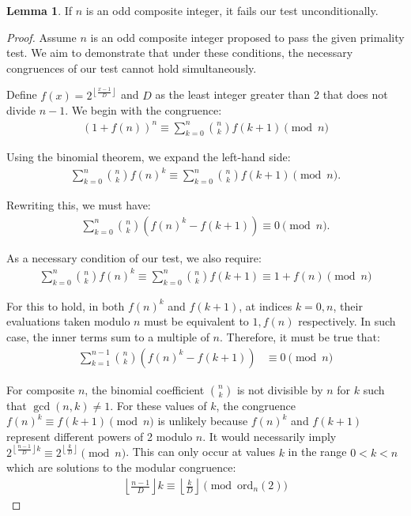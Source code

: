 \documentclass{article}
\theoremstyle{plain}
\theoremstyle{definition}
\newtheorem{lemma}{Lemma}
\begin{document}
\begin{lemma} \label{lemma:composites}
    If $n$ is an odd composite integer, it fails our test unconditionally.
\end{lemma}
\begin{proof}
    Assume \( n \) is an odd composite integer proposed to pass the given primality test. We aim to demonstrate that under these conditions, the necessary congruences of our test cannot hold simultaneously.
    
    Define \( f(x) = 2^{\left\lfloor \frac{x-1}{D} \right\rfloor} \) and \( D \) as the least integer greater than 2 that does not divide \( n-1 \). We begin with the congruence:
    \begin{align}
        (1 + f(n))^n \equiv \sum_{k=0}^{n} \binom{n}{k} f(k+1) \pmod{n}
    \end{align}

    Using the binomial theorem, we expand the left-hand side:
    \begin{align}
        \sum_{k=0}^{n} \binom{n}{k} f(n)^k \equiv \sum_{k=0}^{n} \binom{n}{k} f(k+1) \pmod{n}.
    \end{align}

    Rewriting this, we must have:
    \begin{align}
        \sum_{k=0}^{n} \binom{n}{k} \left(f(n)^k - f(k+1)\right) \equiv 0 \pmod{n}.
    \end{align}
    
    As a necessary condition of our test, we also require:
    \begin{align}
          \sum_{k=0}^{n} \binom{n}{k} f(n)^k \equiv \sum_{k=0}^{n} \binom{n}{k} f(k+1) \equiv 1 + f(n) \pmod{n}
    \end{align}

    For this to hold, in both $f(n)^k$ and $f(k+1)$, at indices $k=0,n$, their evaluations taken modulo $n$ must be equivalent to $1,f(n)$ respectively. In such case, the inner terms sum to a multiple of $n$. Therefore, it must be true that:
    \begin{align}
        \sum_{k=1}^{n-1} \binom{n}{k} \left(f(n)^k - f(k+1)\right) &\equiv 0 \pmod{n}
    \end{align}
    
    For composite \( n \), the binomial coefficient \( \binom{n}{k} \) is not divisible by \( n \) for \( k \) such that \( \gcd(n, k) \neq 1 \). For these values of \( k \), the congruence \( f(n)^k \equiv f(k+1) \pmod{n} \) is unlikely because \( f(n)^k \) and \( f(k+1) \) represent different powers of 2 modulo \( n \). It would necessarily imply $2^{\left\lfloor \frac{n-1}{D} \right\rfloor k} \equiv 2^{\left\lfloor \frac{k}{D} \right\rfloor} \pmod{n}$. This can only occur at values $k$ in the range $0 < k < n$ which are solutions to the modular congruence:
    \begin{align}
        \left\lfloor \frac{n-1}{D} \right\rfloor k \equiv \left\lfloor \frac{k}{D} \right\rfloor \pmod{\text{ord}_n(2)}
    \end{align}


\end{proof}
\end{document}

